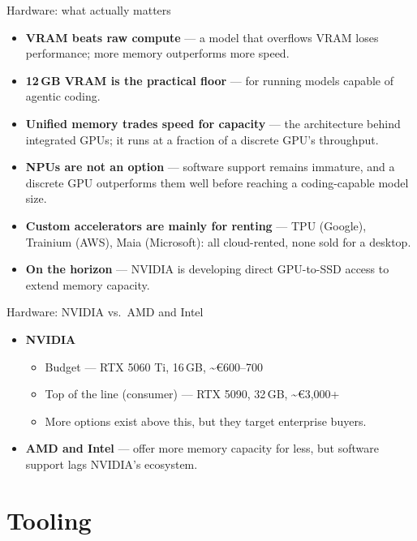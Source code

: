 \documentclass[aspectratio=169,10pt]{beamer}
\begin{document}
\begin{frame}{Hardware: what actually matters}
  \begin{itemize}
    \item \textbf{VRAM beats raw compute} --- a model that overflows VRAM
      loses performance; more memory outperforms more speed.
    \item \textbf{\textcolor{accent}{12\,GB VRAM is the practical floor}} --- for
      running models capable of agentic coding.
    \item \textbf{Unified memory trades speed for capacity} --- the
      architecture behind integrated GPUs; it runs at a fraction of a
      discrete GPU's throughput.
    \item \textbf{NPUs are not an option} --- software support remains
      immature, and a discrete GPU outperforms them well before reaching a
      coding-capable model size.
    \item \textbf{Custom accelerators are mainly for renting} --- TPU
      (Google), Trainium (AWS), Maia (Microsoft): all cloud-rented, none
      sold for a desktop.
    \item \textbf{On the horizon} --- NVIDIA is developing direct GPU-to-SSD
      access to extend memory capacity.
  \end{itemize}
\end{frame}

\begin{frame}{Hardware: NVIDIA vs.\ AMD and Intel}
  \begin{itemize}
    \item \textbf{NVIDIA}
      \begin{itemize}
        \item Budget --- RTX 5060 Ti, 16\,GB, \textasciitilde{}€600--700
        \item Top of the line (consumer) --- RTX 5090, 32\,GB,
          \textasciitilde{}€3{,}000+
        \item More options exist above this, but they target enterprise
          buyers.
      \end{itemize}
    \item \textbf{AMD and Intel} --- offer more memory capacity for less, but
      software support lags NVIDIA's ecosystem.
  \end{itemize}
\end{frame}

\section{Tooling}
\end{document}

